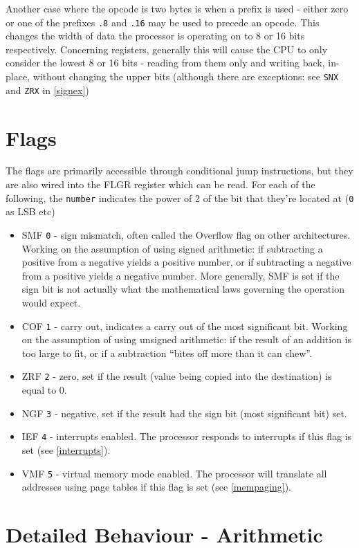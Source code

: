 \documentclass[12pt,a4paper]{report}
\begin{document}
Another case where the opcode is two bytes is when a prefix is used - either zero or one of the prefixes \texttt{.8} and \texttt{.16} may be used to precede an opcode. This changes the width of data the processor is operating on to 8 or 16 bits respectively. Concerning registers, generally this will cause the CPU to only consider the lowest 8 or 16 bits - reading from them only and writing back, in-place, without changing the upper bits (although there are exceptions: see \texttt{SNX} and \texttt{ZRX} in \autoref{signex})

\section{Flags}
The flags are primarily accessible through conditional jump instructions, but they are also wired into the FLGR register which can be read. For each of the following, the \texttt{number} indicates the power of 2 of the bit that they're located at (\texttt{0} as LSB etc)
\begin{itemize}
  \item SMF \texttt{0} - sign mismatch, often called the Overflow flag on other architectures. Working on the assumption of using signed arithmetic: if subtracting a positive from a negative yields a positive number, or if subtracting a negative from a positive yields a negative number. More generally, SMF is set if the sign bit is not actually what the mathematical laws governing the operation would expect.
  \item COF \texttt{1} - carry out, indicates a carry out of the most significant bit. Working on the assumption of using unsigned arithmetic: if the result of an addition is too large to fit, or if a subtraction ``bites off more than it can chew''.
  \item ZRF \texttt{2} - zero, set if the result (value being copied into the destination) is equal to 0.
  \item NGF \texttt{3} - negative, set if the result had the sign bit (most significant bit) set.
  \item IEF \texttt{4} - interrupts enabled. The processor responds to interrupts if this flag is set (see \autoref{interrupts}).
  \item VMF \texttt{5} - virtual memory mode enabled. The processor will translate all addresses using page tables if this flag is set (see \autoref{mempaging}).
\end{itemize}


\section{Detailed Behaviour - Arithmetic}
\end{document}
